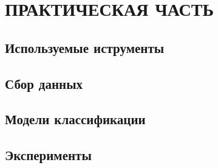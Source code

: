 \section{ПРАКТИЧЕСКАЯ ЧАСТЬ}


\subsection{Используемые иструменты}
\subsection{Сбор данных}
\subsection{Модели классификации}
\subsection{Эксперименты}














































